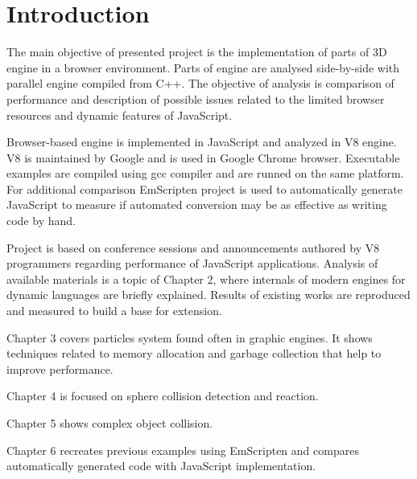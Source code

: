 \chapter{Introduction}
\label{cha:introduction}

The main objective of presented project is the implementation of parts of 3D engine in a browser environment. Parts of engine are analysed side-by-side with parallel engine compiled from C++. The objective of analysis is comparison of performance and description of possible issues related to the limited browser resources and dynamic features of JavaScript.

Browser-based engine is implemented in JavaScript and analyzed in V8 engine. V8 is maintained by Google and is used in Google Chrome browser. Executable examples are compiled using gcc compiler and are runned on the same platform. For additional comparison EmScripten project is used to automatically generate JavaScript to measure if automated conversion may be as effective as writing code by hand.

Project is based on conference sessions and announcements authored by V8 programmers regarding performance of JavaScript applications. Analysis of available materials is a topic of Chapter 2, where internals of modern engines for dynamic languages are briefly explained. Results of existing works are reproduced and measured to build a base for extension.

Chapter 3 covers particles system found often in graphic engines. It shows techniques related to memory allocation and garbage collection that help to improve performance.

Chapter 4 is focused on sphere collision detection and reaction.

Chapter 5 shows complex object collision.

Chapter 6 recreates previous examples using EmScripten and compares automatically generated code with JavaScript implementation.

